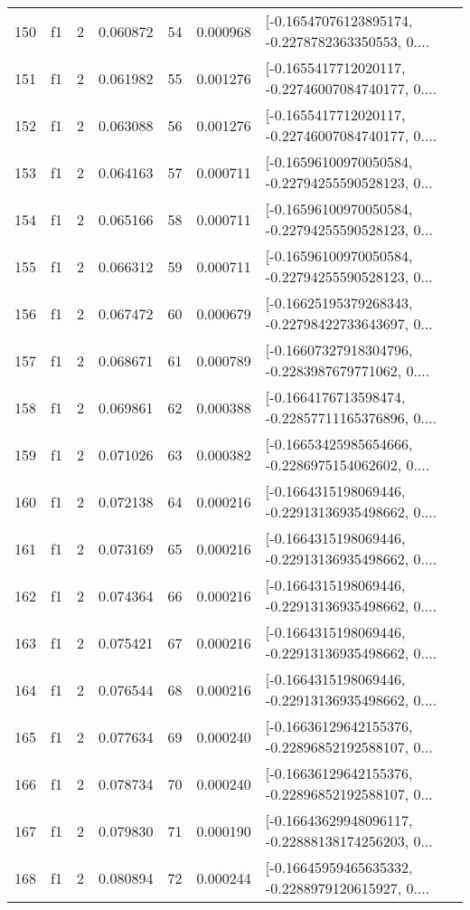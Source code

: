 \begin{tabular}{lllrlrl}
150 &  f1 &   2 &  0.060872 &   54 &  0.000968 &  [-0.16547076123895174, -0.2278782363350553, 0.... \\
151 &  f1 &   2 &  0.061982 &   55 &  0.001276 &  [-0.1655417712020117, -0.22746007084740177, 0.... \\
152 &  f1 &   2 &  0.063088 &   56 &  0.001276 &  [-0.1655417712020117, -0.22746007084740177, 0.... \\
153 &  f1 &   2 &  0.064163 &   57 &  0.000711 &  [-0.16596100970050584, -0.22794255590528123, 0... \\
154 &  f1 &   2 &  0.065166 &   58 &  0.000711 &  [-0.16596100970050584, -0.22794255590528123, 0... \\
155 &  f1 &   2 &  0.066312 &   59 &  0.000711 &  [-0.16596100970050584, -0.22794255590528123, 0... \\
156 &  f1 &   2 &  0.067472 &   60 &  0.000679 &  [-0.16625195379268343, -0.22798422733643697, 0... \\
157 &  f1 &   2 &  0.068671 &   61 &  0.000789 &  [-0.16607327918304796, -0.2283987679771062, 0.... \\
158 &  f1 &   2 &  0.069861 &   62 &  0.000388 &  [-0.1664176713598474, -0.22857711165376896, 0.... \\
159 &  f1 &   2 &  0.071026 &   63 &  0.000382 &  [-0.16653425985654666, -0.2286975154062602, 0.... \\
160 &  f1 &   2 &  0.072138 &   64 &  0.000216 &  [-0.1664315198069446, -0.22913136935498662, 0.... \\
161 &  f1 &   2 &  0.073169 &   65 &  0.000216 &  [-0.1664315198069446, -0.22913136935498662, 0.... \\
162 &  f1 &   2 &  0.074364 &   66 &  0.000216 &  [-0.1664315198069446, -0.22913136935498662, 0.... \\
163 &  f1 &   2 &  0.075421 &   67 &  0.000216 &  [-0.1664315198069446, -0.22913136935498662, 0.... \\
164 &  f1 &   2 &  0.076544 &   68 &  0.000216 &  [-0.1664315198069446, -0.22913136935498662, 0.... \\
165 &  f1 &   2 &  0.077634 &   69 &  0.000240 &  [-0.16636129642155376, -0.22896852192588107, 0... \\
166 &  f1 &   2 &  0.078734 &   70 &  0.000240 &  [-0.16636129642155376, -0.22896852192588107, 0... \\
167 &  f1 &   2 &  0.079830 &   71 &  0.000190 &  [-0.16643629948096117, -0.22888138174256203, 0... \\
168 &  f1 &   2 &  0.080894 &   72 &  0.000244 &  [-0.16645959465635332, -0.2288979120615927, 0.... \\

\end{tabular}
